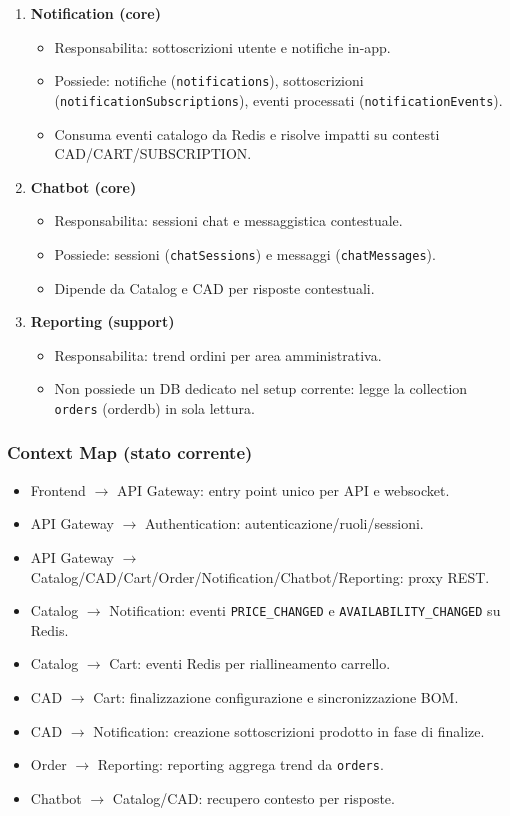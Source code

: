\begin{enumerate}
\item \textbf{Notification (core)}
\begin{itemize}
\item Responsabilita: sottoscrizioni utente e notifiche in-app.
\item Possiede: notifiche (\texttt{notifications}), sottoscrizioni (\texttt{notificationSubscriptions}), eventi processati (\texttt{notificationEvents}).
\item Consuma eventi catalogo da Redis e risolve impatti su contesti CAD/CART/SUBSCRIPTION.
\end{itemize}

\item \textbf{Chatbot (core)}
\begin{itemize}
\item Responsabilita: sessioni chat e messaggistica contestuale.
\item Possiede: sessioni (\texttt{chatSessions}) e messaggi (\texttt{chatMessages}).
\item Dipende da Catalog e CAD per risposte contestuali.
\end{itemize}

\item \textbf{Reporting (support)}
\begin{itemize}
\item Responsabilita: trend ordini per area amministrativa.
\item Non possiede un DB dedicato nel setup corrente: legge la collection \texttt{orders} (orderdb) in sola lettura.
\end{itemize}
\end{enumerate}

\subsubsection{Context Map (stato corrente)}

\begin{itemize}
\item Frontend $\rightarrow$ API Gateway: entry point unico per API e websocket.
\item API Gateway $\rightarrow$ Authentication: autenticazione/ruoli/sessioni.
\item API Gateway $\rightarrow$ Catalog/CAD/Cart/Order/Notification/Chatbot/Reporting: proxy REST.
\item Catalog $\rightarrow$ Notification: eventi \texttt{PRICE\_CHANGED} e \texttt{AVAILABILITY\_CHANGED} su Redis.
\item Catalog $\rightarrow$ Cart: eventi Redis per riallineamento carrello.
\item CAD $\rightarrow$ Cart: finalizzazione configurazione e sincronizzazione BOM.
\item CAD $\rightarrow$ Notification: creazione sottoscrizioni prodotto in fase di finalize.
\item Order $\rightarrow$ Reporting: reporting aggrega trend da \texttt{orders}.
\item Chatbot $\rightarrow$ Catalog/CAD: recupero contesto per risposte.
\end{itemize}

